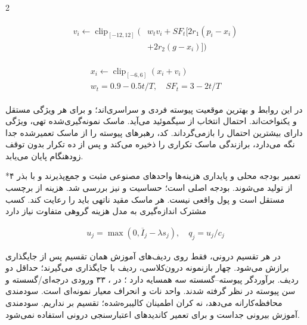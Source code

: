 \documentclass[10pt,a4paper]{article}
\makeatletter
\renewcommand{\section}{\@startsection{section}{1}{0pt}{5pt}{2pt}{\normalfont\normalsize\bfseries}}
\newcommand{\sect}[1]{\section*{#1}}
\makeatother
\begin{document}
\begin{multicols}{2}
\begin{latin}\begin{equation}\begin{gathered}\begin{aligned}v_i\leftarrow\operatorname{clip}_{[-12,12]}\big(&w_t v_i+SF_t[2r_1(p_i-x_i)\\&+2r_2(g-x_i)]\big)\end{aligned}\end{gathered}\end{equation}\end{latin}
\begin{latin}\begin{equation}\begin{gathered}\begin{gathered}x_i\leftarrow\operatorname{clip}_{[-6,6]}(x_i+v_i)\\w_t=0.9-0.5t/T,\quad SF_t=3-2t/T\end{gathered}\end{gathered}\end{equation}\end{latin}
در این روابط  و  بهترین موقعیت پیوسته فردی و سراسری‌اند؛  و  برای هر ویژگی مستقل و یکنواخت‌اند. احتمال انتخاب از سیگموئید  می‌آید. ماسک نمونه‌گیری‌شده تهی، ویژگی دارای بیشترین احتمال را بازمی‌گرداند. کد، رهبرهای پیوسته را از ماسک تعمیرشده جدا نگه می‌دارد، برازندگی ماسک تکراری را ذخیره می‌کند و پس از ده تکرار بدون توقف زودهنگام پایان می‌یابد.

\sect{۴  تعمیر بودجه محلی و پایداری}
هزینه‌ها واحدهای مصنوعی مثبت و جمع‌پذیرند و با بذر  از  تولید می‌شوند. بودجه اصلی  است؛ حساسیت  و  نیز بررسی شد. هزینه از برچسب مستقل است و پول واقعی نیست. هر ماسک مقید ناتهی باید  را رعایت کند. کسب مشترک اندازه‌گیری به مدل هزینه گروهی متفاوت نیاز دارد 

\begin{latin}\begin{equation}\begin{gathered}u_j=\max(0,\overline I_j-\lambda s_j),\quad q_j=u_j/c_j\end{gathered}\end{equation}\end{latin}
در هر تقسیم درونی،  فقط روی ردیف‌های آموزش همان تقسیم پس از جایگذاری برازش می‌شود. چهار بازنمونه درون‌کلاسی،  ردیف با جایگذاری می‌گیرند؛ حداقل دو ردیف. برآوردگر پیوسته–گسسته سه همسایه دارد \lr{[11]}؛ در ، ۳۳ ورودی درجه‌ای/گسسته و سن پیوسته در نظر گرفته شدند. واحد  نات و  انحراف معیار نمونه‌ای است.  سودمندی محافظه‌کارانه می‌دهد، نه کران اطمینان کالیبره‌شده؛ تقسیم بر  نداریم. سودمندی آموزش بیرونی جداست و برای تعمیر کاندیدهای اعتبارسنجی درونی استفاده نمی‌شود.


\end{multicols}
\end{document}
